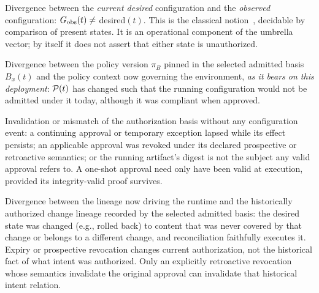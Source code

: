 \begin{definition}
\label{def:confdrift}
Divergence between the \emph{current desired} configuration and the
\emph{observed} configuration: $G_{\mathrm{obs}}(t) \ne$ desired$(t)$. This is the
classical notion~\cite{awsconfig,driftctl,nist800128}, decidable by
comparison of present states.
It is an operational component of the umbrella vector; by itself it does not
assert that either state is unauthorized.
\end{definition}

\begin{definition}
\label{def:poldrift}
Divergence between the policy version $\pi_B$ pinned in the selected admitted
basis $B_x(t)$ and the policy
context now governing the environment, \emph{as it bears on this deployment}:
$\mathcal{P}(t)$ has changed such that the running configuration would not be
admitted under it today, although it was compliant when approved.
\end{definition}

\begin{definition}
\label{def:authdrift}
Invalidation or mismatch of the authorization basis without any configuration
event: a continuing approval or temporary exception lapsed while its effect
persists; an applicable approval was revoked under its declared prospective
or retroactive semantics; or the running artifact's digest is not the subject
any valid approval refers to. A one-shot approval need only have been valid at
execution, provided its integrity-valid proof survives.
\end{definition}

\begin{definition}
\label{def:intdrift}
Divergence between the lineage now driving the runtime and the historically
authorized change lineage recorded by the selected admitted basis: the desired
state was changed (e.g., rolled back) to content that was never covered by that
change or belongs to a different change, and reconciliation faithfully executes
it. Expiry or prospective revocation changes current authorization, not the
historical fact of what intent was authorized. Only an explicitly retroactive
revocation whose semantics invalidate the original approval can invalidate that
historical intent relation.
\end{definition}

